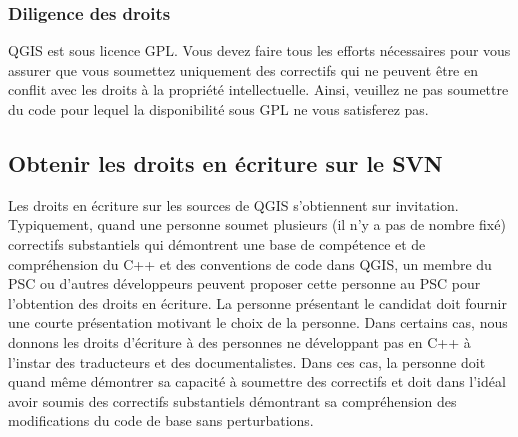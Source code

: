 \subsubsection{Diligence des droits}
QGIS est sous licence GPL. Vous devez faire tous les efforts nécessaires pour vous assurer que vous soumettez uniquement des correctifs qui ne peuvent être en conflit avec les droits à la propriété intellectuelle. Ainsi, veuillez ne pas soumettre du code pour lequel la disponibilité sous GPL ne vous satisferez pas.

\subsection{Obtenir les droits en écriture sur le SVN}
Les droits en écriture sur les sources de QGIS s'obtiennent sur invitation. Typiquement, quand une personne soumet plusieurs (il n'y a pas de nombre fixé) correctifs substantiels qui démontrent une base de compétence et de compréhension du C++ et des conventions de code dans QGIS, un membre du PSC ou d'autres développeurs peuvent proposer cette personne au PSC pour l'obtention des droits en écriture. La personne présentant le candidat doit fournir une courte présentation motivant le choix de la personne. Dans certains cas, nous donnons les droits d'écriture à des personnes ne développant pas en C++ à l'instar des traducteurs et des documentalistes. Dans ces cas, la personne doit quand même démontrer sa capacité à soumettre des correctifs et doit dans l'idéal avoir soumis des correctifs substantiels démontrant sa compréhension des modifications du code de base sans perturbations.

